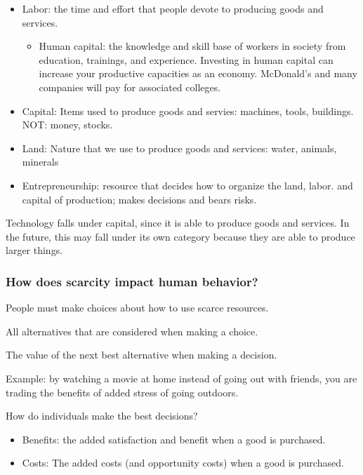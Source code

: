 \documentclass{scrreprt} %
\begin{document}
\begin{itemize}
	\item Labor: the time and effort that people devote to producing goods
	and services.
	\begin{itemize}
		\item Human capital: the knowledge and skill base of workers in society
		from education, trainings, and experience.
		Investing in human capital can increase your productive capacities as
		an economy. McDonald's and many companies will pay for associated colleges.
	\end{itemize}
	\item Capital: Items used to produce goods and servies: machines, tools,
	buildings. NOT: money, stocks.
	\item Land: Nature that we use to produce goods and services: water, animals, minerals
	\item Entrepreneurship: resource that decides how to organize the land, labor.
	and capital of production; makes decisions and bears risks.
\end{itemize}

\begin{remark}
	Technology falls under capital, since it is able to produce goods and services.
	In the future, this may fall under its own category because they are able
	to produce larger things.
\end{remark}

\subsubsection{How does scarcity impact human behavior?}

People must make choices about how to use scarce resources.

\begin{definition}[Tradeoffs]
	All alternatives that are considered when making a choice.
\end{definition}

\begin{definition}
	The value of the next best alternative when making a decision.
\end{definition}

Example: by watching a movie at home instead of going out with friends, you are trading
the benefits of added stress of going outdoors.

How do individuals make the best decisions?

\begin{itemize}
	\item Benefits: the added satisfaction and benefit when a good is purchased.
	\item Costs: The added costs (and opportunity costs) when a good is purchased.
\end{itemize}
\end{document}
